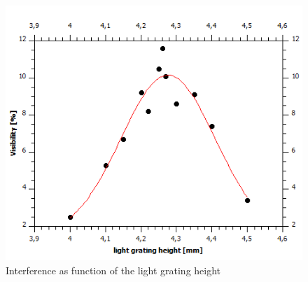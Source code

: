 \documentclass[12pt,a4paper]{article}
\begin{document}
\begin{multicols}{2}



\end{multicols}
\begin{figure}[H]
\centering
\includegraphics[scale=0.55]{./data/LGH.png}
\caption{Interference as function of the light grating height}
\label{fig:LGH}
\end{figure}
\end{document}
